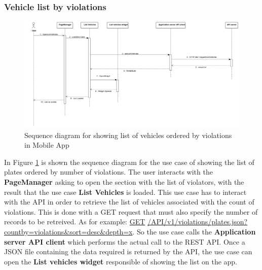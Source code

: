 \subsubsection{Vehicle list by violations}%
\begin{figure}[H]
\centering
\includegraphics[width=\textwidth]{Images/DDSeqAppList.png}
\caption{\label{fig:DDSeqAppList} Sequence diagram for showing list of vehicles ordered by violations in Mobile App }
\end{figure}

In Figure \ref{fig:DDSeqAppList} is shown the sequence diagram for the use case of showing the list of plates ordered by number of violations.
The user interacts with the \textbf{PageManager} asking to open the section with the list of violators, with the result that the use case \textbf{List Vehicles} is loaded. This use case has to interact with the API in order to retrieve the list of vehicles associated with the count of violations. This is done with a GET request that must also specify the number of records to be retreived. As for example: \url{GET} \url{/API/v1/violations/plates.json?countby=violations&sort=desc&depth=x}. So the use case calls the \textbf{Application server API client}  which performs the actual call to the REST API. Once a JSON file containing the data required is returned by the API, the use case can open the \textbf{List vehicles widget} responsible of showing the list on the app.


